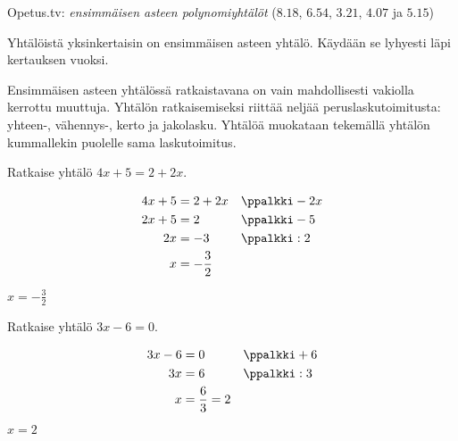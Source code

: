 {Opetus.tv: \emph{ensimmäisen asteen polynomiyhtälöt} ($8.18$, $6.54$, $3.21$, $4.07$ ja $5.15$)}

Yhtälöistä yksinkertaisin on ensimmäisen asteen yhtälö. Käydään se lyhyesti läpi kertauksen vuoksi.

Ensimmäisen asteen yhtälössä ratkaistavana on vain mahdollisesti vakiolla kerrottu muuttuja. Yhtälön ratkaisemiseksi riittää neljää peruslaskutoimitusta: yhteen-, vähennys-, kerto ja jakolasku. Yhtälöä muokataan tekemällä yhtälön kummallekin puolelle sama laskutoimitus.



\begin{esimerkki}
Ratkaise yhtälö $4x + 5 = 2 + 2x$.
	\begin{esimratk}
\begin{align*}
    4x + 5 &= 2 + 2x && \ppalkki -2x \\
    2x + 5 &= 2      && \ppalkki -5 \\
        2x &= -3     && \ppalkki :2 \\
         x &= -\frac{3}{2}
 \end{align*}
	\end{esimratk}
	\begin{esimvast}
$x=-\frac{3}{2}$
	\end{esimvast}
\end{esimerkki}

\begin{esimerkki}
Ratkaise yhtälö $3x - 6 = 0$.
	\begin{esimratk}
  \begin{align*}
    3x - 6 &= 0 && \ppalkki +6 \\
        3x &= 6 && \ppalkki :3 \\
         x &= \frac{6}{3}  = 2 \\
  \end{align*}
	\end{esimratk}
	\begin{esimvast}
$x=2$
	\end{esimvast}
\end{esimerkki}

